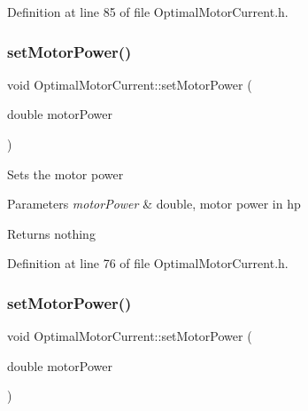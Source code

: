 Definition at line 85 of file Optimal\+Motor\+Current.\+h.

\mbox{\label{class_optimal_motor_current_a4950fe2e789f5c150648a846898aff74}} 
\subsubsection{\texorpdfstring{set\+Motor\+Power()}{setMotorPower()}\hspace{0.1cm}{\footnotesize\ttfamily [1/3]}}
{\footnotesize\ttfamily void Optimal\+Motor\+Current\+::set\+Motor\+Power (\begin{DoxyParamCaption}\item[{double}]{motor\+Power }\end{DoxyParamCaption})\hspace{0.3cm}{\ttfamily [inline]}}

Sets the motor power


\begin{DoxyParams}{Parameters}
{\em motor\+Power} & double, motor power in hp\\
\hline
\end{DoxyParams}
\begin{DoxyReturn}{Returns}
nothing 
\end{DoxyReturn}


Definition at line 76 of file Optimal\+Motor\+Current.\+h.

\mbox{\label{class_optimal_motor_current_a4950fe2e789f5c150648a846898aff74}} 
\subsubsection{\texorpdfstring{set\+Motor\+Power()}{setMotorPower()}\hspace{0.1cm}{\footnotesize\ttfamily [2/3]}}
{\footnotesize\ttfamily void Optimal\+Motor\+Current\+::set\+Motor\+Power (\begin{DoxyParamCaption}\item[{double}]{motor\+Power }\end{DoxyParamCaption})\hspace{0.3cm}{\ttfamily [inline]}}

